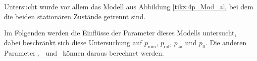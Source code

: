 Untersucht wurde vor allem das Modell aus Abbildung \ref{tikz:4p_Mod_a}, bei dem die beiden stationären Zustände getrennt sind.

Im Folgenden werden die Einflüsse der Parameter dieses Modells untersucht, dabei beschränkt sich diese Untersuchung auf $p_{\text{mm}}$, $p_{\text{ml}}$, $p_{\text{aa}}$ und $p_{\text{ll}}$. Die anderen Parameter \pma, \pam\ und \plm\ können daraus berechnet werden.


% 
% 
